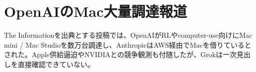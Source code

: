 \section{OpenAIのMac大量調達報道}
The Informationを出典とする投稿では、OpenAIがRLやcomputer-use向けにMac mini / Mac Studioを数万台調達し、AnthropicはAWS経由でMacを借りているとされた。Apple供給逼迫やNVIDIAとの競争観測も付随したが、Grokは一次見出しを直接確認できていない。
